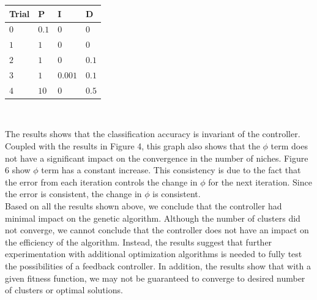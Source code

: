 \documentclass{sig-alternate}
\begin{document}
\begin{center}
\begin{tabular}{ l | l | l | l }
  Trial & P & I & D \\ \hline
  $0$ & $0.1$ & $0$ & $0$  \\
  $1$ &   $1$ & $0$ & $0$ \\
  $2$ &   $1$ & $0$ & $0.1$ \\
  $3$ &   $1$ & $0.001$ & $0.1$  \\
  $4$ &  $10$ & $0$ & $0.5$ 
\end{tabular} \\
\end{center}


The results shows that the classification accuracy is invariant of the controller. Coupled with the results in Figure 4, this graph also shows that the $\phi$ term does not have a significant impact on the convergence in the number of niches. Figure 6 show $\phi$ term has a constant increase. This consistency is due to the fact that the error from each iteration controls the change in $\phi$ for the next iteration. Since the error is consistent, the change in $\phi$ is consistent.\\
\indent Based on all the results shown above, we conclude that the controller had minimal impact on the genetic algorithm. Although the number of clusters did not converge, we cannot conclude that the controller does not have an impact on the efficiency of the algorithm. Instead, the results suggest that further experimentation with additional optimization algorithms is needed to fully test the possibilities of a feedback controller. In addition, the results show that with a given fitness function, we may not be guaranteed to converge to desired number of clusters or optimal solutions. 
\end{document}
